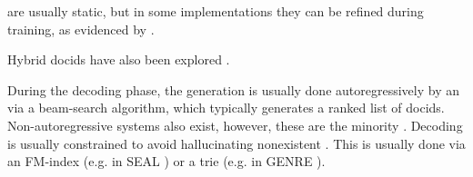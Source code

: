  are usually static, but in some implementations they can be refined during training, as evidenced by \citet{sunkyung-lee-glen-generative,weiwei-sun-learning-to}.

Hybrid docids have also been explored \cite{thong-nguyen-generative-retrieval}.





During the decoding phase, the generation is usually done autoregressively by an  via a beam-search algorithm, which typically %
generates a ranked list of docids. Non-autoregressive systems also exist, however, these are the minority \cite{ravisri-valluri-scaling-the,xinpeng-zhao-diffugr-generative}.
Decoding is usually constrained to avoid hallucinating nonexistent . This is usually done via an FM-index \cite{ferragina-opportunistic-data} (e.g. in SEAL \cite{michele-bevilacqua-autoregressive-search}) or a trie (e.g. in GENRE \cite{nicola-de-cao-autoregressive-entity}).

